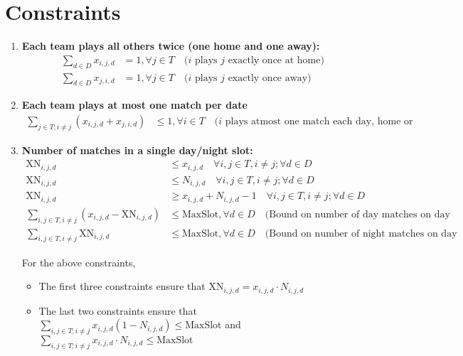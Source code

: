 \documentclass[a4paper, 12pt]{article}
\begin{document}
\section*{Constraints}
\begin{enumerate}
    \item \textbf{Each team plays all others twice (one home and one away):}
    \begin{align*}
        \sum_{d \in D} x_{i,j,d} &= 1 , \forall j \in T \quad \text{($i$ plays $j$ exactly once at home)}\\
        \sum_{d \in D} x_{j,i,d} &= 1 , \forall j \in T \quad \text{($i$ plays $j$ exactly once away)}
    \end{align*}

    \item \textbf{Each team plays at most one match per date}
    \begin{align*}
        \sum_{j \in T; i \neq j} (x_{i,j,d} + x_{j,i,d}) &\leq 1, \forall i \in T \quad \text{($i$ plays atmost one match each day, home or away)}
    \end{align*}

    \item \textbf{Number of matches in a single day/night slot:}
    \begin{align*}
        \text{XN}_{i,j,d} &\leq x_{i,j,d} \quad \forall i,j \in T, i \neq j; \forall d \in D\\
        \text{XN}_{i,j,d} &\leq N_{i,j,d} \quad \forall i,j \in T, i \neq j; \forall d \in D\\
        \text{XN}_{i,j,d} &\geq x_{i,j,d} + N_{i,j,d} - 1 \quad \forall i,j \in T, i \neq j; \forall d \in D\\
        \sum_{i,j \in T, i \neq j} (x_{i,j,d} -\text{XN}_{i,j,d}) &\leq \text{MaxSlot}, \forall d \in D \quad \text{(Bound on number of day matches on day d)}\\
        \sum_{i,j \in T, i \neq j} \text{XN}_{i,j,d} &\leq \text{MaxSlot}, \forall d \in D \quad \text{(Bound on number of night matches on day d)}
    \end{align*}

    For the above constraints,
    \begin{itemize}
        \item The first three constraints ensure that $\text{XN}_{i,j,d} = x_{i,j,d}\cdot N_{i,j,d}$
        \item The last two constraints ensure that $\sum_{i,j \in T; i \neq j} x_{i,j,d}(1 - N_{i,j,d}) \leq \text{MaxSlot}$ and $\sum_{i,j \in T; i \neq j} x_{i,j,d}\cdot N_{i,j,d} \leq \text{MaxSlot}$
    \end{itemize}


\end{enumerate}
\end{document}
